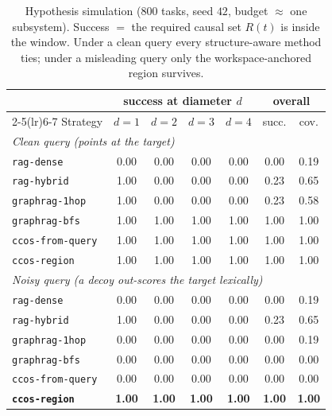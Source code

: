 \documentclass[11pt]{article}
\newcommand{\code}[1]{\texttt{#1}}
\begin{document}
\begin{table}[h]
\centering
\begin{tabular}{lcccccc}
\toprule
& \multicolumn{4}{c}{success at diameter $d$} & \multicolumn{2}{c}{overall} \\
\cmidrule(lr){2-5}\cmidrule(lr){6-7}
Strategy & $d{=}1$ & $d{=}2$ & $d{=}3$ & $d{=}4$ & succ. & cov. \\
\midrule
\multicolumn{7}{l}{\emph{Clean query (points at the target)}}\\
\code{rag-dense}      & 0.00 & 0.00 & 0.00 & 0.00 & 0.00 & 0.19 \\
\code{rag-hybrid}     & 1.00 & 0.00 & 0.00 & 0.00 & 0.23 & 0.65 \\
\code{graphrag-1hop}  & 1.00 & 0.00 & 0.00 & 0.00 & 0.23 & 0.58 \\
\code{graphrag-bfs}   & 1.00 & 1.00 & 1.00 & 1.00 & 1.00 & 1.00 \\
\code{ccos-from-query}& 1.00 & 1.00 & 1.00 & 1.00 & 1.00 & 1.00 \\
\code{ccos-region}    & 1.00 & 1.00 & 1.00 & 1.00 & 1.00 & 1.00 \\
\midrule
\multicolumn{7}{l}{\emph{Noisy query (a decoy out-scores the target lexically)}}\\
\code{rag-dense}      & 0.00 & 0.00 & 0.00 & 0.00 & 0.00 & 0.19 \\
\code{rag-hybrid}     & 1.00 & 0.00 & 0.00 & 0.00 & 0.23 & 0.65 \\
\code{graphrag-1hop}  & 0.00 & 0.00 & 0.00 & 0.00 & 0.00 & 0.19 \\
\code{graphrag-bfs}   & 0.00 & 0.00 & 0.00 & 0.00 & 0.00 & 0.00 \\
\code{ccos-from-query}& 0.00 & 0.00 & 0.00 & 0.00 & 0.00 & 0.00 \\
\textbf{\code{ccos-region}} & \textbf{1.00} & \textbf{1.00} & \textbf{1.00} & \textbf{1.00} & \textbf{1.00} & \textbf{1.00} \\
\bottomrule
\end{tabular}
\caption{Hypothesis simulation ($800$ tasks, seed $42$, budget $\approx$ one
subsystem). Success $=$ the required causal set $R(t)$ is inside the window. Under
a clean query every structure-aware method ties; under a misleading query only
the workspace-anchored region survives.}
\label{tab:sim}
\end{table}
\end{document}

